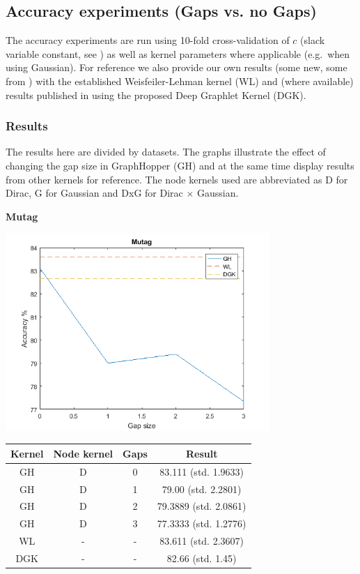 \documentclass{article}
\begin{document}
\subsection{Accuracy experiments (Gaps vs. no Gaps)}
The accuracy experiments are run using 10-fold cross-validation of $c$ (slack variable constant, see \cite{svm-graph-kernels}) as well as kernel parameters where applicable (e.g.\ when using Gaussian). For reference we also provide our own results (some new, some from \cite{svm-graph-kernels}) with the established Weisfeiler-Lehman kernel\cite{WL} (WL) and (where available) results published in \cite{yanardag} using the proposed Deep Graphlet Kernel (DGK).

\subsubsection{Results}
The results here are divided by datasets. The graphs illustrate the effect of changing the gap size in GraphHopper (GH) and at the same time display results from other kernels for reference. The node kernels used are abbreviated as D for Dirac, G for Gaussian and DxG for Dirac $\times$ Gaussian.

\textbf{Mutag}\\
\begin{minipage}{0.6\linewidth}
		\hspace*{-1in}
		\includegraphics[width=10cm]{mutag}
		\label{fig:mutag}
\end{minipage}
\begin{minipage}[c]{0.5\linewidth}
	
	\centering
	\begin{tabular}{c|c|c|c}
			Kernel & Node kernel & Gaps &  Result\\
			\hline
			GH & D & 0 & 83.111 (std. 1.9633)\\
			GH & D & 1 & 79.00 (std. 2.2801)\\
			GH & D & 2 & 79.3889 (std. 2.0861)\\
			GH & D & 3 &  77.3333 (std. 1.2776)\\
			WL & - & - & 83.611 (std. 2.3607)\\
			DGK & - & - & 82.66 (std. 1.45)
		\end{tabular}
	\label{table:mutag}
\end{minipage}
\end{document}
